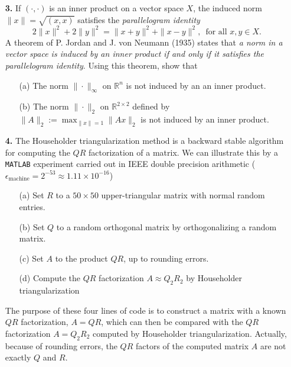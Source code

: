\documentclass[10pt]{report}
\begin{document}
\begin{enumerate}
\item[\textbf{3.}] If $(\cdot,\cdot)$ is an inner product on a vector  space $X$, the induced norm $\|x\|= \sqrt{(x, x)}$ satisfies the \textit{parallelogram identity}
\[2 \|x\|^2 + 2\|y\|^2 = \|x+y\|^2 + \|x-y\|^2, \, \text{ for all } x,y \in X.\]
A theorem of P. Jordan and J. von Neumann (1935) states that \textit{a norm in a vector space is induced by an inner product if and only if it satisfies the parallelogram identity}. Using this theorem, show that
\begin{enumerate}
  \item[(a)] The norm $\|\cdot\|_{\infty}$ on $\mathbb{R}^n$ is not induced by an an inner product.
  \item[(b)] The norm $\|\cdot\|_{2}$ on $\mathbb{R}^{2\times 2}$ defined by $\|A\|_2:= \max_{\|x\|=1}\|Ax\|_2$ is not induced by an inner product.
\end{enumerate}









\item[\textbf{4.}] 
The Householder triangularization method is a backward stable algorithm
  for computing the $QR$ factorization of a matrix. We can illustrate this by a \verb+MATLAB+
  experiment carried out in IEEE double precision arithmetic
  ($\epsilon_{\text{machine}}=2^{-53}\approx 1.11\times10^{-16}$)

  \begin{enumerate}
    \item[(a)] Set $R$ to a $50\times50$ upper-triangular matrix with normal
    random entries.
    \item[(b)] Set $Q$ to a random orthogonal matrix by orthogonalizing a random
    matrix.
    \item[(c)] Set $A$ to the product $QR$, up to rounding errors.
    \item[(d)] Compute the $QR$ factorization $A\approx Q_2R_2$ by Householder
    triangularization 
  \end{enumerate}

  The purpose of these four lines of code is to construct a matrix with a known
  $QR$ factorization, $A=QR$, which can then be compared with the $QR$
  factorization $A=Q_2R_2$ computed by Householder triangularization. Actually,
  because of rounding errors, the $QR$ factors of the computed matrix $A$ are
  not exactly $Q$ and $R$.


\end{enumerate}
\end{document}
